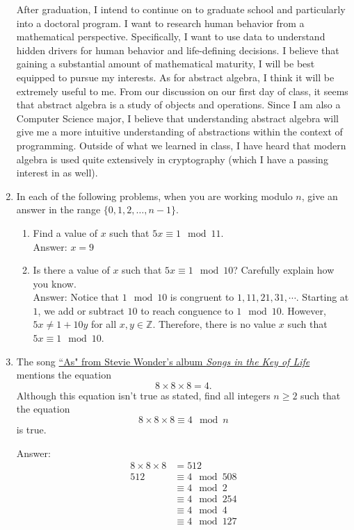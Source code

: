\documentclass[11pt,twoside]{article}
\begin{document}
\begin{enumerate}
After graduation, I intend to continue on to graduate school and particularly into a doctoral program.  I want to research human behavior from a mathematical perspective.  Specifically, I want to use data to understand hidden drivers for human behavior and life-defining decisions.  I believe that gaining a substantial amount of mathematical maturity, I will be best equipped to pursue my interests.  As for abstract algebra, I think it will be extremely useful to me.  From our discussion on our first day of class, it seems that abstract algebra is a study of objects and operations.  Since I am also a Computer Science major, I believe that understanding abstract algebra will give me a more intuitive understanding of abstractions within the context of programming.  Outside of what we learned in class, I have heard that modern algebra is used quite extensively in cryptography (which I have a passing interest in as well).

\vspace{0.5cm}

\item In each of the following problems, when you are working modulo $n$, give an answer in the range $\{0,1,2, \ldots, n-1\}$.

\begin{enumerate}[label=(\alph*)]
\item Find a value of $x$ such that $5x \equiv 1 \!\mod 11$.\\
{\color{red}Answer:} $x = 9$
\item Is there a value of $x$ such that $5x \equiv 1 \!\mod 10$?  Carefully explain how you know.\\
{\color{red}Answer:} Notice that $1 \!\mod 10$ is congruent to $1,11,21,31,\cdots$.  Starting at $1$, we add or subtract $10$ to reach conguence to $1 \!\mod 10$.  However, $5x \neq 1 + 10y$ for all $x,y \in \mathbb{Z}$.  Therefore, there is no value $x$ such that $5x \equiv 1 \!\mod 10$.
\end{enumerate}

\vspace{0.5cm}

\item The song \href{https://www.youtube.com/watch?v=L_sG0weS1d8}{``As" from Stevie Wonder's album {\it Songs in the Key of Life}} mentions the equation
\[8 \times 8 \times 8 = 4.\]
Although this equation isn't true as stated, find all integers $n \geq 2$ such that the equation
\[8 \times 8 \times 8 \equiv 4 \!\mod n\]
is true.

{\color{red}Answer:}
\begin{align*}
8 \times 8 \times 8 &= 512\\
512 &\equiv 4 \!\mod 508\\
&\equiv 4 \!\mod 2\\
&\equiv 4 \!\mod 254\\
&\equiv 4 \!\mod 4\\
&\equiv 4 \!\mod 127
\end{align*}


\end{enumerate}
\end{document}
